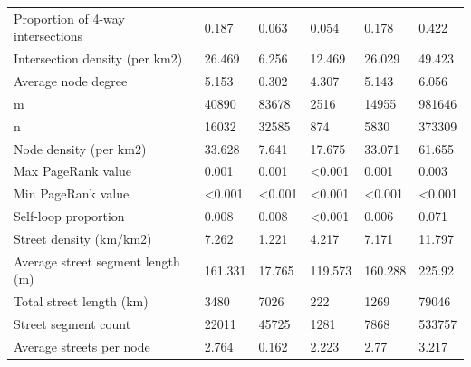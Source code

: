 \documentclass{article}
\begin{document}
\begin{table}
\begin{tabular}{llllll}
	Proportion of 4-way intersections           & 0.187          & 0.063          & 0.054          & 0.178          & 0.422          \\
	Intersection density (per km2)              & 26.469         & 6.256          & 12.469         & 26.029         & 49.423         \\
	Average node degree                         & 5.153          & 0.302          & 4.307          & 5.143          & 6.056          \\
	m                                           & 40890          & 83678          & 2516           & 14955          & 981646         \\
	n                                           & 16032          & 32585          & 874            & 5830           & 373309         \\
	Node density (per km2)                      & 33.628         & 7.641          & 17.675         & 33.071         & 61.655         \\
	Max PageRank value                          & 0.001          & 0.001          & \textless0.001 & 0.001          & 0.003          \\
	Min PageRank value                          & \textless0.001 & \textless0.001 & \textless0.001 & \textless0.001 & \textless0.001 \\
	Self-loop proportion                        & 0.008          & 0.008          & \textless0.001 & 0.006          & 0.071          \\
	Street density (km/km2)                     & 7.262          & 1.221          & 4.217          & 7.171          & 11.797         \\
	Average street segment length (m)           & 161.331        & 17.765         & 119.573        & 160.288        & 225.92         \\
	Total street length (km)                    & 3480           & 7026           & 222            & 1269           & 79046          \\
	Street segment count                        & 22011          & 45725          & 1281           & 7868           & 533757         \\
	Average streets per node                    & 2.764          & 0.162          & 2.223          & 2.77           & 3.217          \\
	\bottomrule
\end{tabular}
\end{table}
\end{document}
